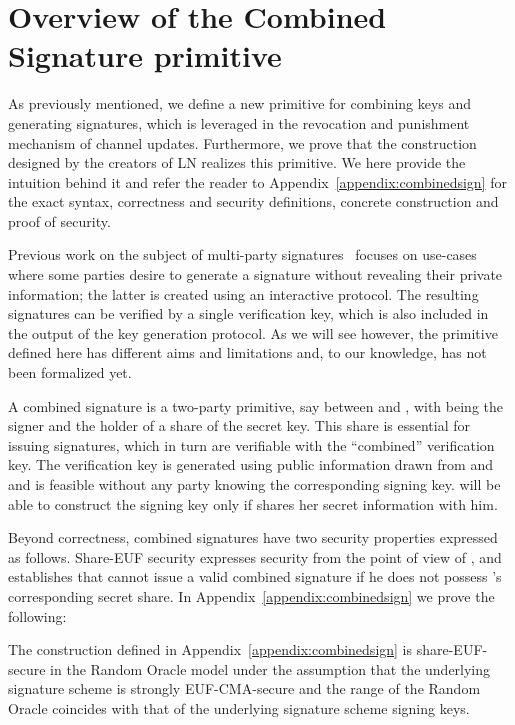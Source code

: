 \section{Overview of the Combined Signature primitive}
\label{sec:ov-combined-ds}
  As previously mentioned, we define a new primitive for combining keys and
  generating signatures, which is leveraged in the revocation and punishment
  mechanism of channel updates. Furthermore, we prove that the construction
  designed by the creators of LN realizes this primitive. We here provide the
  intuition behind it and refer the reader to
  Appendix~\ref{appendix:combinedsign} for the exact syntax, correctness and
  security definitions, concrete construction and proof of security.

  Previous work on the subject of multi-party
  signatures~\cite{DBLP:conf/ndss/NicolosiKDM03,DBLP:journals/iacr/BellareS01,boyd1986digital,DBLP:conf/ndss/Ganesan95a,DBLP:conf/crypto/MacKenzieR01,ganesan1994secure}
  focuses on use-cases where some parties desire to generate a signature without
  revealing their private information; the latter is created using an
  interactive protocol. The resulting signatures can be verified by a single
  verification key, which is also included in the output of the key generation
  protocol. As we will see however, the primitive defined here has different
  aims and limitations and, to our knowledge, has not been formalized yet.

  A combined signature is a two-party primitive, say between \alice{} and \bob,
  with \bob{} being the signer and \alice{} the holder of a share of the secret
  key. This share is essential for issuing signatures, which in turn are
  verifiable with the ``combined'' verification key. The verification key is
  generated using public information drawn from \alice{} and \bob{} and is
  feasible without any party knowing the corresponding signing key. \bob{} will
  be able to construct the signing key only if \alice{} shares her secret
  information with him.

  Beyond correctness, combined signatures have two security properties expressed
  as follows. \textsf{Share-EUF} security expresses security from the point of
  view of \alice{}, and establishes that \bob{} cannot issue a valid combined
  signature if he does not possess \alice's corresponding secret share. In
  Appendix~\ref{appendix:combinedsign} we prove the following:

  \begin{lemma}
    \label{lemma:comb:share}
    The construction defined in Appendix~\ref{appendix:combinedsign} is
    \textsf{share-EUF}-secure in the Random Oracle model under the assumption
    that the underlying signature scheme is strongly \textsf{EUF-CMA}-secure and
    the range of the Random Oracle coincides with that of the underlying
    signature scheme signing keys.
  \end{lemma}

